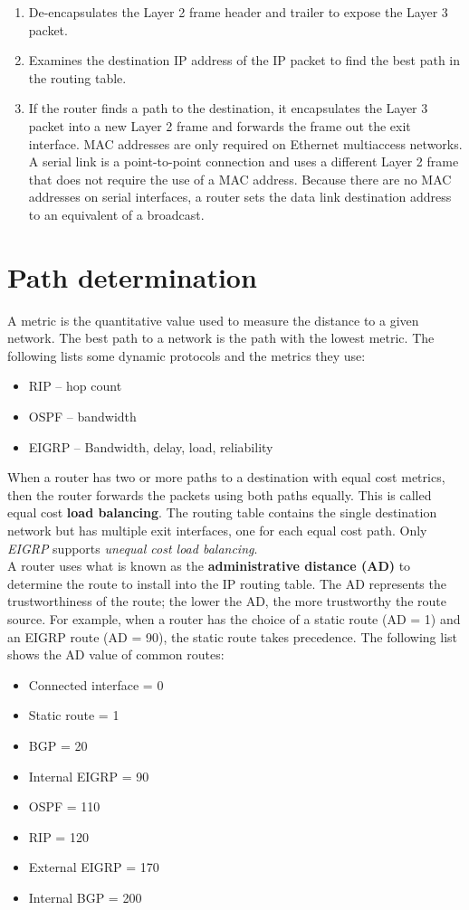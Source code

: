\begin{enumerate}
\item De-encapsulates the Layer 2 frame header and trailer to expose the Layer 3 packet.

\item Examines the destination IP address of the IP packet to find the best path in the routing table.

\item If the router finds a path to the destination, it encapsulates the Layer 3 packet into a new Layer 2 frame and forwards the frame out the exit interface. MAC addresses are only required on Ethernet multiaccess networks. A serial link is a point-to-point connection and uses a different Layer 2 frame that does not require the use of a MAC address. Because there are no MAC addresses on serial interfaces, a router sets the data link destination address to an equivalent of a broadcast.
\end{enumerate}

\section{Path determination}

A metric is the quantitative value used to measure the distance to a given network. The best path to a network is the path with the lowest metric. The following lists some dynamic protocols and the metrics they use:

\begin{itemize}
\item RIP -- hop count
\item OSPF -- bandwidth
\item EIGRP -- Bandwidth, delay, load, reliability
\end{itemize}

When a router has two or more paths to a destination with equal cost metrics, then the router forwards the packets using both paths equally. This is called equal cost \textbf{load balancing}. The routing table contains the single destination network but has multiple exit interfaces, one for each equal cost path. Only \emph{EIGRP} supports \emph{unequal cost load balancing}.\\

A router uses what is known as the \textbf{administrative distance (AD)} to determine the route to install into the IP routing table. The AD represents the trustworthiness of the route; the lower the AD, the more trustworthy the route source. For example, when a router has the choice of a static route (AD = 1) and an EIGRP route (AD = 90), the static route takes precedence. The following list shows the AD value of common routes:

\begin{itemize}
\item Connected interface = 0
\item Static route = 1
\item BGP = 20
\item Internal EIGRP = 90
\item OSPF = 110
\item RIP = 120
\item External EIGRP = 170
\item Internal BGP = 200
\end{itemize}